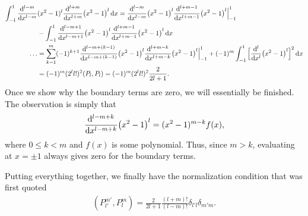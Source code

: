 \begin{align}
    \int_{-1}^{1} \dv[l-m]{x} &(x^2-1)^{l} \dv[l+m]{x} (x^2 - 1)^{l} \dd{x} = \dv[l-m]{x} (x^2 - 1)^{l} \dv[l+m-1]{x} (x^2-1)^{l} \Big|_{-1}^{1} \nonumber \\
                                                                           &- \int_{-1}^{1} \dv[l-m+1]{x} (x^2 - 1)^{l} \dv[l+m-1]{x} (x^2 - 1)^{l} \dd{x} \nonumber \\
    \ldots &= \sum_{k=1}^{m} (-1)^{k+1} \dv[l-m+(k-1)]{x} (x^2 - 1)^{l} \dv[l+m-k]{x} (x^2-1)^{l}\Big|_{-1}^{1} + (-1)^{m} \int_{-1}^{1} \Big[ \dv[l]{x} (x^2-1)^{l} \Big]^2 \dd{x} \nonumber \\
           &= (-1)^{m} (2^{l} l!)^2 (P_{l},P_{l}) = (-1)^{m} (2^{l} l!)^{2} \frac{2}{2l+1}
.\end{align}
Once we show why the boundary terms are zero, we will essentially be finished.
The observation is simply that 
\begin{eqnarray}
    \dv[l-m+k]{x} (x^2 - 1)^{l} = (x^2 - 1)^{m-k} f(x)
,\end{eqnarray}
where $0 \leq k < m$ and $f(x)$ is some polynomial.
Thus, since $m > k$, evaluating at $x = \pm 1$ always gives zero for the boundary terms.

Putting everything together, we finally have the normalization condition that was first quoted
\begin{eqnarray}
    (P_{l'}^{m'},P_{l}^{m}) = \frac{2}{2l+1} \frac{(l+m)!}{(l-m)!} \delta_{l'l} \delta_{m'm}
.\end{eqnarray}







